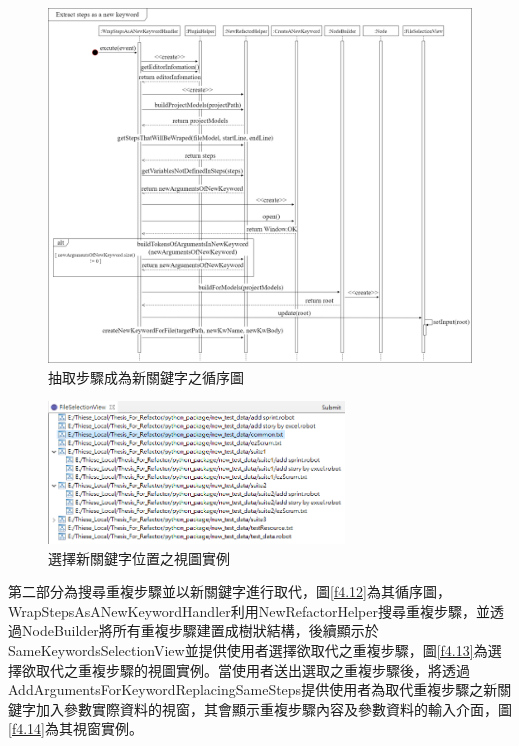 \begin{figure}[H]
	\centering
    \includegraphics[width=1.05\textwidth]{picture/ch4/sequenceDiagram/wrap_steps_as_a_new_keyword_sequence_diagram.png}
    \caption{抽取步驟成為新關鍵字之循序圖}
    \label{f4.10}
\end{figure}

\begin{figure}[H]
	\centering
    \includegraphics[width=0.7\textwidth]{picture/ch4/choose_file_view.PNG}
    \caption{選擇新關鍵字位置之視圖實例}
    \label{f4.11}
\end{figure}

\indent
第二部分為搜尋重複步驟並以新關鍵字進行取代，圖\ref{f4.12}為其循序圖，WrapStepsAsANewKeywordHandler利用NewRefactorHelper搜尋重複步驟，並透過NodeBuilder將所有重複步驟建置成樹狀結構，後續顯示於SameKeywordsSelectionView並提供使用者選擇欲取代之重複步驟，圖\ref{f4.13}為選擇欲取代之重複步驟的視圖實例。當使用者送出選取之重複步驟後，將透過AddArgumentsForKeywordReplacingSameSteps提供使用者為取代重複步驟之新關鍵字加入參數實際資料的視窗，其會顯示重複步驟內容及參數資料的輸入介面，圖\ref{f4.14}為其視窗實例。

